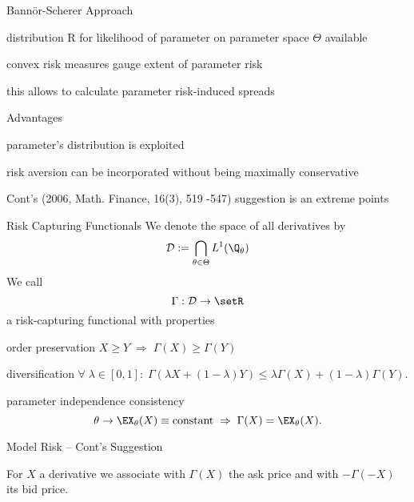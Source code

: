 


{Bann{\"o}r-Scherer Approach}






	distribution R for likelihood of parameter on parameter space $\Theta$  available


	convex risk measures gauge extent of parameter risk


	this allows to calculate parameter risk-induced spreads


	Advantages






	parameter's distribution is exploited


	risk aversion can be incorporated without being maximally conservative


	Cont's (2006, Math. Finance, 16(3), 519 -547) suggestion is an extreme points









{Risk Capturing Functionals}
We denote the space of all derivatives by
\begin{equation}
{\cal D} := \bigcap_{\theta \in \Theta} L^1(\Q_\theta)
\end{equation}
We call
$$
\Gamma: {\cal D} \rightarrow \setR
$$
a risk-capturing functional with properties






	order preservation $X \geq Y \; \Rightarrow \; \Gamma(X) \geq \Gamma(Y)$


	diversification $\forall \; \lambda \in [0,1]: \; \Gamma(\lambda X + (1-\lambda) Y) \leq \lambda \Gamma(X) + (1-\lambda) \Gamma(Y).$


	parameter independence consistency
$$
\theta \rightarrow \EX_\theta(X) \equiv \mbox{constant} \; \Rightarrow \; \Gamma(X) = \EX_\theta(X).
$$





{Model Risk -- Cont's Suggestion}






	For $X$ a derivative we associate with
$\Gamma(X)$ the ask price and with $-\Gamma(-X)$ its bid price.



